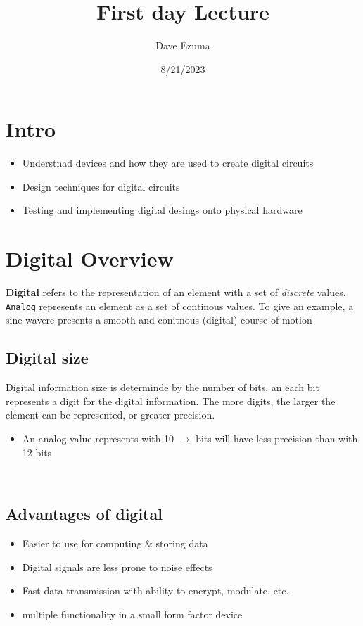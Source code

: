 \documentclass[a4paper, 12pt]{article}
\title{First day Lecture}
\date{8/21/2023}
\author{Dave Ezuma}
\begin{document}
    \maketitle
    \section*{Intro}
    \begin{itemize}
        \item Understnad devices and how they are used to create digital circuits
        \item Design techniques for digital circuits
        \item Testing and implementing digital desings onto physical hardware
    \end{itemize}
    \section{Digital Overview}
    \textbf{Digital} refers to the representation of an element with a set of \textit{discrete} values. \\
    \texttt{Analog} represents an element as a set of continous values. To give an example, a sine wavere
    presents a smooth and conitnous (digital) course of motion

    \subsection*{Digital size}
    Digital information size is determinde by the number of bits, an each bit represents a digit for the digital information.
    The more digits, the larger the element can be represented, or greater precision.
    \begin{itemize}
        \item An analog value represents with 10 $\rightarrow$ bits will have less precision than with 12 bits
    \end{itemize}
    \
    \subsection*{Advantages of digital}
    \begin{itemize}
        \item Easier to use for computing \& storing data
        \item Digital signals are less prone to noise effects
        \item Fast data transmission with ability to encrypt, modulate, etc.
        \item multiple functionality in a small form factor device
    \end{itemize}
\end{document}
